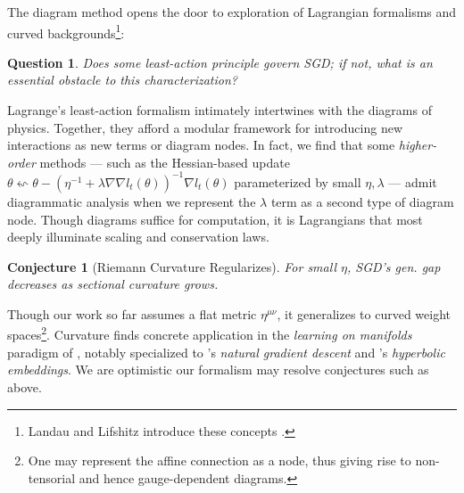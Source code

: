 \documentclass{article}
\theoremstyle{plain}
\newtheorem{conj}{Conjecture}
\newtheorem{quest}{Question}
\theoremstyle{definition}
\begin{document}

        The diagram method opens the door to exploration of Lagrangian
        formalisms and curved backgrounds\footnote{
            Landau and Lifshitz introduce these concepts
            .
        }:
        \begin{quest}
            Does some least-action principle govern SGD; if not, what is an
            essential obstacle to this characterization?
        \end{quest}
        Lagrange's least-action formalism intimately intertwines with the
        diagrams of physics.  Together, they afford a modular framework for
        introducing new interactions as new terms or diagram nodes.  In fact,
        we find that some \emph{higher-order} methods --- such as the
        Hessian-based update
        $
            \theta \leftsquigarrow
            \theta -
            (\eta^{-1} + \lambda \nabla \nabla l_t(\theta))^{-1}
            \nabla l_t(\theta)
        $
        parameterized by small $\eta, \lambda$ --- admit diagrammatic analysis
        when we represent the $\lambda$ term as a second type of diagram node.
        Though diagrams suffice for computation, it is Lagrangians that most
        deeply illuminate scaling and conservation laws.
        \begin{conj}[Riemann Curvature Regularizes]
            For small $\eta$, SGD's gen. gap decreases as sectional curvature
            grows.
        \end{conj}
        Though our work so far assumes a flat metric $\eta^{\mu\nu}$, it
        generalizes to curved weight spaces\footnote{
            One may represent the affine connection as a node, thus giving
            rise to non-tensorial and hence gauge-dependent diagrams.
        }.
        Curvature finds concrete application in the \emph{learning on
        manifolds} paradigm of \citet{ab07, zh16}, notably specialized to
        \citet{am98}'s \emph{natural gradient descent} and \citet{ni17}'s
        \emph{hyperbolic embeddings}.  We are optimistic our formalism may
        resolve conjectures such as above.

\end{document}
